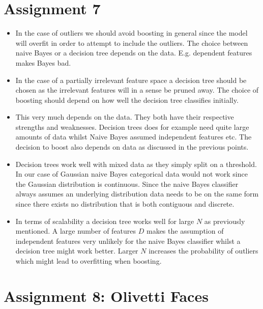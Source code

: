\documentclass{article}
\begin{document}
\section*{Assignment 7}

\begin{itemize}

\item In the case of outliers we should avoid boosting in general since the model will overfit in order to attempt to include the outliers. The choice between naive Bayes or a decision tree depends on the data. E.g. dependent features makes Bayes bad.

\item In the case of a partially irrelevant feature space a decision tree should be chosen as the irrelevant features will in a sense be pruned away. The choice of boosting should depend on how well the decision tree classifies initially.

\item This very much depends on the data. They both have their respective strengths and weaknesses. Decision trees does for example need quite large amounts of data whilst Naive Bayes assumed independent features etc. The decision to boost also depends on data as discussed in the previous points.

\item Decision trees work well with mixed data as they simply split on a threshold. In our case of Gaussian naive Bayes categorical data would not work since the Gaussian distribution is continuous. Since the naive Bayes classifier always assumes an underlying distribution data needs to be on the same form since there exists no distribution that is both contiguous and discrete.

\item In terms of scalability a decision tree works well for large $N$ as previously mentioned. A large number of features $D$ makes the assumption of independent features very unlikely for the naive Bayes classifier whilst a decision tree might work better. Larger $N$ increases the probability of outliers which might lead to overfitting when boosting.

\end{itemize}

\newpage

\section*{Assignment 8: Olivetti Faces}
\end{document}
